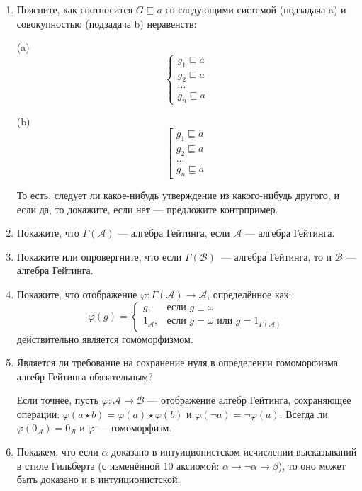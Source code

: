 \documentclass[10pt,a4paper,oneside]{article}
\begin{document}
\begin{enumerate}
\item Поясните, как соотносится $G \sqsubseteq a$ со следующими системой (подзадача a) 
и совокупностью (подзадача b) неравенств:

\begin{multicols}{2}%
(a) $$\left\{\begin{array}{l}
g_1 \sqsubseteq a\\
g_2 \sqsubseteq a\\
\dots\\
g_n \sqsubseteq a\end{array}\right.
$$

(b) $$\left[\begin{array}{l}
g_1 \sqsubseteq a\\
g_2 \sqsubseteq a\\
\dots\\
g_n \sqsubseteq a\end{array}\right.$$
\end{multicols}
То есть, следует ли какое-нибудь утверждение из какого-нибудь другого, и если да, то докажите,
если нет --- предложите контрпример.

\item Покажите, что $\Gamma(\mathcal{A})$ --- алгебра Гейтинга, если $\mathcal{A}$ --- алгебра Гейтинга.

\item Покажите или опровергните, что если $\Gamma(\mathcal{B})$~--- алгебра Гейтинга, 
то и $\mathcal{B}$ --- алгебра Гейтинга.

\item Покажите, что отображение $\varphi: \Gamma(\mathcal{A})\to\mathcal{A}$, определённое как:
$$\varphi(g) = \left\{\begin{array}{ll}
   g,& \mbox{если }g \sqsubset \omega\\
   1_\mathcal{A},& \mbox{если }g = \omega \mbox{ или } g = 1_{\Gamma(\mathcal{A})}\end{array}\right.$$
действительно является гомоморфизмом.

\item Является ли требование на сохранение нуля в определении гомоморфизма алгебр Гейтинга обязательным?

Если точнее, пусть $\varphi: \mathcal{A} \to \mathcal{B}$ --- отображение алгебр Гейтинга, 
сохраняющее операции: $\varphi(a\star b) = \varphi(a)\star\varphi(b)$ и $\varphi(\neg a) = \neg \varphi (a)$.
Всегда ли $\varphi(0_\mathcal{A}) = 0_\mathcal{B}$ и $\varphi$ --- гомоморфизм.

\item Покажем, что если $\alpha$ доказано в интуиционистском исчислении высказываний 
в стиле Гильберта (с изменённой 10 аксиомой:
$\alpha\to\neg\alpha\to\beta$), то оно может быть доказано и в интуиционистской. 


\end{enumerate}
\end{document}
